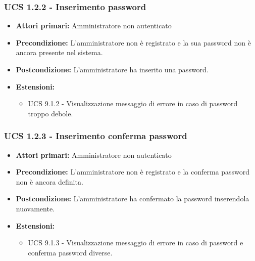 \subsubsection{UCS 1.2.2 - Inserimento password}%
\begin{itemize}
\item \textbf{Attori primari:} Amministratore non autenticato
\item \textbf{Precondizione:} L'amministratore non è registrato e la sua password non è ancora presente nel sistema.
\item \textbf{Postcondizione:} L'amministratore ha inserito una password.
\item \textbf{Estensioni:}
	\begin{itemize}
		\item UCS 9.1.2 - Visualizzazione messaggio di errore in caso di password troppo debole.
	\end{itemize}
\end{itemize}

\subsubsection{UCS 1.2.3 - Inserimento conferma password}%
\begin{itemize}
\item \textbf{Attori primari:} Amministratore non autenticato
\item \textbf{Precondizione:} L'amministratore non è registrato e la conferma password non è ancora definita.
\item \textbf{Postcondizione:} L'amministratore ha confermato la password inserendola nuovamente.
\item \textbf{Estensioni:}
	\begin{itemize}
		\item UCS 9.1.3 - Visualizzazione messaggio di errore in caso di password e conferma password diverse.
	\end{itemize}
\end{itemize}

